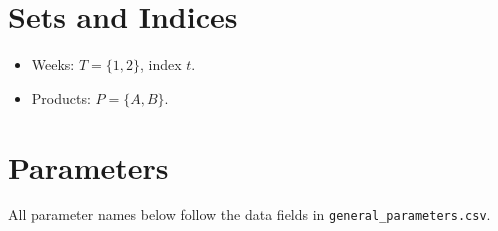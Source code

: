\section*{Sets and Indices}

\begin{itemize}
    \item Weeks: $T = \{1,2\}$, index $t$.
    \item Products: $P = \{A,B\}$.
\end{itemize}

\section*{Parameters}

All parameter names below follow the data fields in \texttt{general\_parameters.csv}.

